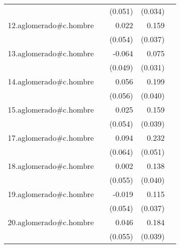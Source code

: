 {\begin{longtable}{l*{4}{D{.}{.}{-1}}}
            &                     &     (0.051)         &     (0.034)         &                     \\
\addlinespace
12.aglomerado#c.hombre&                     &       0.022         &       0.159\sym{***}&                     \\
            &                     &     (0.054)         &     (0.037)         &                     \\
\addlinespace
13.aglomerado#c.hombre&                     &      -0.064         &       0.075\sym{*}  &                     \\
            &                     &     (0.049)         &     (0.031)         &                     \\
\addlinespace
14.aglomerado#c.hombre&                     &       0.056         &       0.199\sym{***}&                     \\
            &                     &     (0.056)         &     (0.040)         &                     \\
\addlinespace
15.aglomerado#c.hombre&                     &       0.025         &       0.159\sym{***}&                     \\
            &                     &     (0.054)         &     (0.039)         &                     \\
\addlinespace
17.aglomerado#c.hombre&                     &       0.094         &       0.232\sym{***}&                     \\
            &                     &     (0.064)         &     (0.051)         &                     \\
\addlinespace
18.aglomerado#c.hombre&                     &       0.002         &       0.138\sym{***}&                     \\
            &                     &     (0.055)         &     (0.040)         &                     \\
\addlinespace
19.aglomerado#c.hombre&                     &      -0.019         &       0.115\sym{**} &                     \\
            &                     &     (0.054)         &     (0.037)         &                     \\
\addlinespace
20.aglomerado#c.hombre&                     &       0.046         &       0.184\sym{***}&                     \\
            &                     &     (0.055)         &     (0.039)         &                     \\

\end{longtable}}
